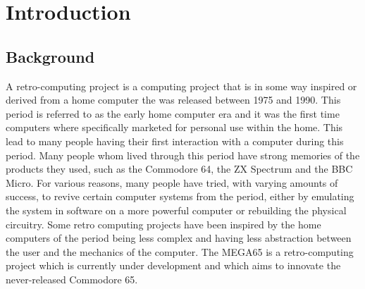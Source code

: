 \chapter{Introduction} %
\label{Chapter1} %

\section{Background}
A retro-computing project is a computing project that is in some way inspired or derived from a home computer the was released between 1975 and 1990. This period is referred to as the early home computer era and it was the first time computers where specifically marketed for personal use within the home. This lead to many people having their first interaction with a computer during this period. Many people whom lived through this period have strong memories of the products they used, such as the Commodore 64, the ZX Spectrum and the BBC Micro. For various reasons, many people have tried, with varying amounts of success, to revive certain computer systems from the period, either by emulating the system in software on a more powerful computer or rebuilding the physical circuitry. Some retro computing projects have been inspired by the home computers of the period being less complex and having less abstraction between the user and the mechanics of the computer. The MEGA65 is a retro-computing project which is currently under development and which aims to innovate the never-released Commodore 65. 


